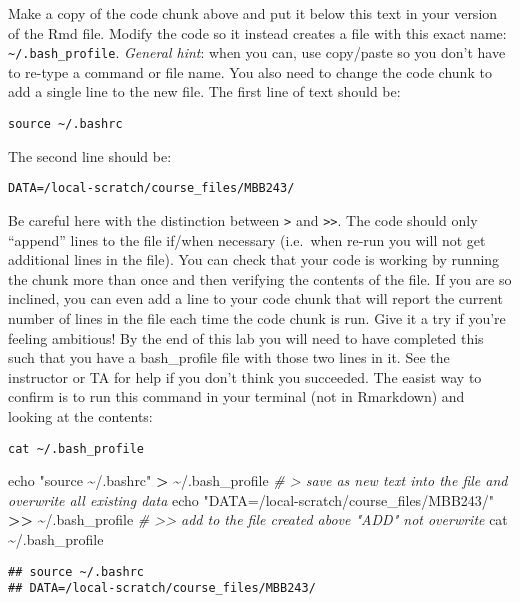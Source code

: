 \documentclass[
]{article}
\newenvironment{Shaded}{\begin{snugshade}}{\end{snugshade}}
\newcommand{\BuiltInTok}[1]{#1}
\newcommand{\CommentTok}[1]{\textcolor[rgb]{0.56,0.35,0.01}{\textit{#1}}}
\newcommand{\FunctionTok}[1]{\textcolor[rgb]{0.00,0.00,0.00}{#1}}
\newcommand{\NormalTok}[1]{#1}
\newcommand{\OperatorTok}[1]{\textcolor[rgb]{0.81,0.36,0.00}{\textbf{#1}}}
\newcommand{\StringTok}[1]{\textcolor[rgb]{0.31,0.60,0.02}{#1}}
\begin{document}
Make a copy of the code chunk above and put it below this text in your
version of the Rmd file. Modify the code so it instead creates a file
with this exact name: \texttt{\textasciitilde{}/.bash\_profile}.
\emph{General hint}: when you can, use copy/paste so you don't have to
re-type a command or file name. You also need to change the code chunk
to add a single line to the new file. The first line of text should be:

\texttt{source\ \textasciitilde{}/.bashrc}

The second line should be:

\texttt{DATA=/local-scratch/course\_files/MBB243/}

Be careful here with the distinction between \texttt{\textgreater{}} and
\texttt{\textgreater{}\textgreater{}}. The code should only ``append''
lines to the file if/when necessary (i.e.~when re-run you will not get
additional lines in the file). You can check that your code is working
by running the chunk more than once and then verifying the contents of
the file. If you are so inclined, you can even add a line to your code
chunk that will report the current number of lines in the file each time
the code chunk is run. Give it a try if you're feeling ambitious! By the
end of this lab you will need to have completed this such that you have
a bash\_profile file with those two lines in it. See the instructor or
TA for help if you don't think you succeeded. The easist way to confirm
is to run this command in your terminal (not in Rmarkdown) and looking
at the contents:

\texttt{cat\ \textasciitilde{}/.bash\_profile}

\begin{Shaded}
\begin{Highlighting}[]
\BuiltInTok{echo} \StringTok{"source \textasciitilde{}/.bashrc"} \OperatorTok{\textgreater{}}\NormalTok{ \textasciitilde{}/.bash\_profile}
\CommentTok{\# \textgreater{} save as new text into the file and overwrite all existing data}
\BuiltInTok{echo} \StringTok{"DATA=/local{-}scratch/course\_files/MBB243/"} \OperatorTok{\textgreater{}\textgreater{}}\NormalTok{ \textasciitilde{}/.bash\_profile}
\CommentTok{\# \textgreater{}\textgreater{} add to the file created above "ADD" not overwrite}
\FunctionTok{cat}\NormalTok{ \textasciitilde{}/.bash\_profile}
\end{Highlighting}
\end{Shaded}

\begin{verbatim}
## source ~/.bashrc
## DATA=/local-scratch/course_files/MBB243/
\end{verbatim}
\end{document}
